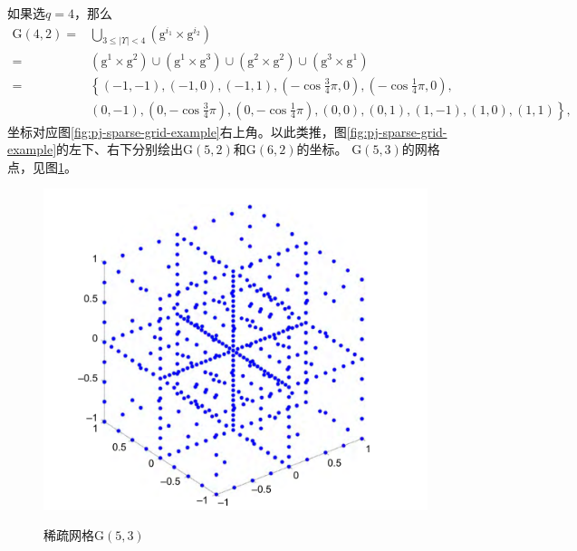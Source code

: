 如果选$q=4$，那么
\begin{equation*}
  \begin{split}
    \mathrm{G} \left( 4, 2 \right)
    = & \bigcup_{3 \le \left| \Upsilon \right| < 4} \left( \mathrm{g}^{i_1} \times \mathrm{g}^{i_2} \right) \\
    = & \left( \mathrm{g}^{1} \times \mathrm{g}^{2} \right)
    \cup
    \left( \mathrm{g}^{1} \times \mathrm{g}^{3} \right)
    \cup
    \left( \mathrm{g}^{2} \times \mathrm{g}^{2} \right)
    \cup
    \left( \mathrm{g}^{3} \times \mathrm{g}^{1} \right)\\
    = & \left\{
    (-1,-1),(-1,0),(-1,1),
    \left( -\cos\frac{3}{4}\pi, 0 \right),
    \left( -\cos\frac{1}{4}\pi, 0 \right), \right.\\
    & \left. (0,-1), \left(0, -\cos\frac{3}{4}\pi \right), \left(0, -\cos\frac{1}{4}\pi \right), (0,0), (0,1),
    (1,-1), (1,0), (1,1)
    \right\},
  \end{split}
\end{equation*}
坐标对应图\ref{fig:pj-sparse-grid-example}右上角。以此类推，图\ref{fig:pj-sparse-grid-example}的左下、右下分别绘出$\mathrm{G} \left(5,2 \right)$和$\mathrm{G} \left(6,2 \right)$的坐标。
$\mathrm{G} \left( 5,3 \right)$的网格点，见图\ref{fig:pj-sparse-grid-example-g53}。
\begin{figure}[htbp]
   \caption{稀疏网格$\mathrm{G}(5,3)$}
  \centering
  \includegraphics[width=12cm]{./Figures/20180325-sparse-grid-G53}
  \label{fig:pj-sparse-grid-example-g53}
\end{figure}

